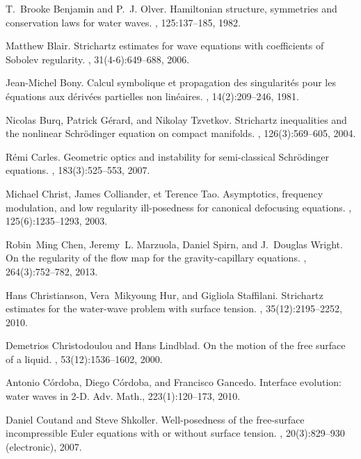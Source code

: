 \documentclass[11pt,english]{smfart}
\theoremstyle{plain}
\theoremstyle{definition}
\numberwithin{equation}{section}
\begin{document}
\begin{thebibliography}{10}
T.~Brooke Benjamin and P.~J. Olver.
\newblock Hamiltonian structure, symmetries and conservation laws for water
  waves.
, 125:137--185, 1982.

Matthew Blair.
\newblock Strichartz estimates for wave equations with coefficients of
  {S}obolev regularity.
, 31(4-6):649--688, 2006.

Jean-Michel Bony.
\newblock Calcul symbolique et propagation des singularit\'es pour les
  \'equations aux d\'eriv\'ees partielles non lin\'eaires.
, 14(2):209--246, 1981.

Nicolas Burq, Patrick G\'erard, and Nikolay Tzvetkov.
\newblock Strichartz inequalities and the nonlinear {S}chr\"odinger equation on
  compact manifolds.
, 126(3):569--605, 2004.

R{\'e}mi Carles.
\newblock Geometric optics and instability for semi-classical {S}chr\"odinger
  equations.
, 183(3):525--553, 2007.

Michael Christ, James Colliander, et Terence Tao.
\newblock Asymptotics, frequency modulation, and low regularity ill-posedness
  for canonical defocusing equations.
, 125(6):1235--1293, 2003.

Robin~Ming Chen, Jeremy~L. Marzuola, Daniel Spirn, and J.~Douglas Wright.
\newblock On the regularity of the flow map for the gravity-capillary
  equations.
, 264(3):752--782, 2013.

Hans Christianson, Vera~Mikyoung Hur, and Gigliola Staffilani.
\newblock Strichartz estimates for the water-wave problem with surface tension.
, 35(12):2195--2252, 2010.

Demetrios Christodoulou and Hans Lindblad.
\newblock On the motion of the free surface of a liquid.
, 53(12):1536--1602, 2000.

Antonio C{\'o}rdoba, Diego C{\'o}rdoba, and Francisco Gancedo.
\newblock Interface evolution: water waves in 2-D.
\newblock Adv. Math., 223(1):120--173, 2010.

Daniel Coutand and Steve Shkoller.
\newblock Well-posedness of the free-surface incompressible {E}uler equations
  with or without surface tension.
, 20(3):829--930 (electronic), 2007.


\end{thebibliography}
\end{document}
